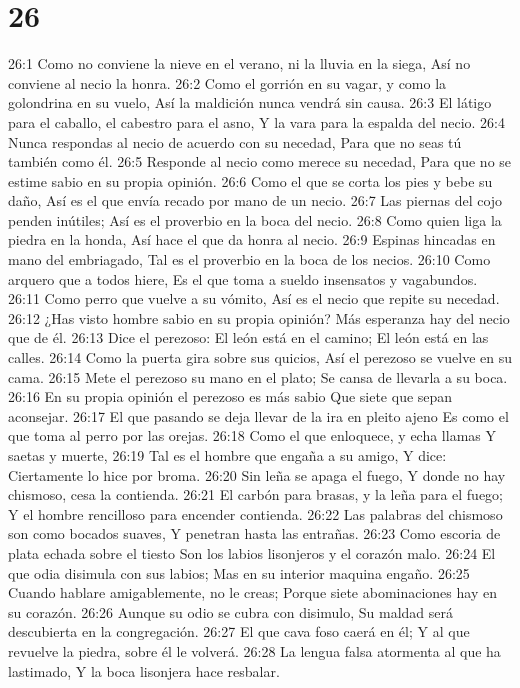\chapter{26}


26:1 Como no conviene la nieve en el verano, ni la lluvia en la siega,  
Así no conviene al necio la honra.  
26:2 Como el gorrión en su vagar, y como la golondrina en su vuelo,  
Así la maldición nunca vendrá sin causa.  
26:3 El látigo para el caballo, el cabestro para el asno,  
Y la vara para la espalda del necio.  
26:4 Nunca respondas al necio de acuerdo con su necedad,  
Para que no seas tú también como él.  
26:5 Responde al necio como merece su necedad,  
Para que no se estime sabio en su propia opinión.  
26:6 Como el que se corta los pies y bebe su daño,  
Así es el que envía recado por mano de un necio.  
26:7 Las piernas del cojo penden inútiles;  
Así es el proverbio en la boca del necio.  
26:8 Como quien liga la piedra en la honda,  
Así hace el que da honra al necio.  
26:9 Espinas hincadas en mano del embriagado,  
Tal es el proverbio en la boca de los necios.  
26:10 Como arquero que a todos hiere,  
Es el que toma a sueldo insensatos y vagabundos.  
26:11 Como perro que vuelve a su vómito, 
Así es el necio que repite su necedad.  
26:12 ¿Has visto hombre sabio en su propia opinión?  
Más esperanza hay del necio que de él.  
26:13 Dice el perezoso: El león está en el camino;  
El león está en las calles.  
26:14 Como la puerta gira sobre sus quicios,  
Así el perezoso se vuelve en su cama.  
26:15 Mete el perezoso su mano en el plato;  
Se cansa de llevarla a su boca.  
26:16 En su propia opinión el perezoso es más sabio  
Que siete que sepan aconsejar.  
26:17 El que pasando se deja llevar de la ira en pleito ajeno  
Es como el que toma al perro por las orejas.  
26:18 Como el que enloquece, y echa llamas  
Y saetas y muerte,  
26:19 Tal es el hombre que engaña a su amigo,  
Y dice: Ciertamente lo hice por broma.  
26:20 Sin leña se apaga el fuego,  
Y donde no hay chismoso, cesa la contienda.  
26:21 El carbón para brasas, y la leña para el fuego;  
Y el hombre rencilloso para encender contienda.  
26:22 Las palabras del chismoso son como bocados suaves,  
Y penetran hasta las entrañas.  
26:23 Como escoria de plata echada sobre el tiesto  
Son los labios lisonjeros y el corazón malo.  
26:24 El que odia disimula con sus labios;  
Mas en su interior maquina engaño.  
26:25 Cuando hablare amigablemente, no le creas;  
Porque siete abominaciones hay en su corazón.  
26:26 Aunque su odio se cubra con disimulo,  
Su maldad será descubierta en la congregación.  
26:27 El que cava foso caerá en él;  
Y al que revuelve la piedra, sobre él le volverá.  
26:28 La lengua falsa atormenta al que ha lastimado,  
Y la boca lisonjera hace resbalar.  

